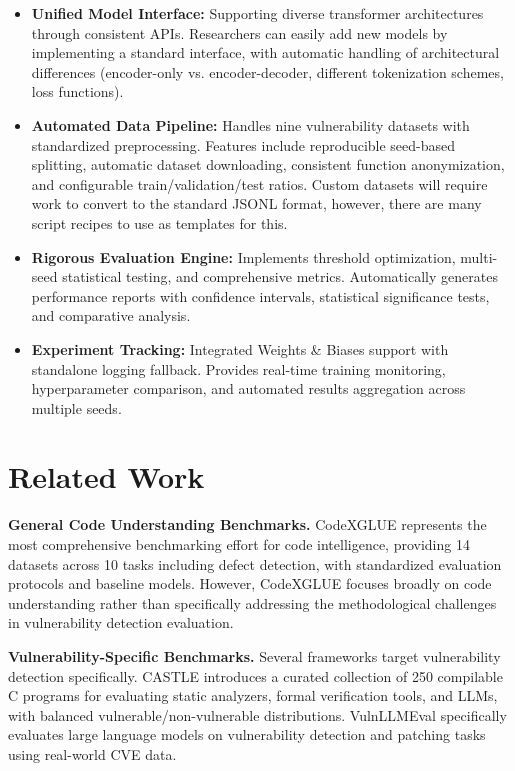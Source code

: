 \documentclass[letterpaper]{article}
\begin{document}
\begin{itemize}
	\item \textbf{Unified Model Interface:} Supporting diverse transformer architectures through consistent APIs. Researchers can easily add new models by implementing a standard interface, with automatic handling of architectural differences (encoder-only vs. encoder-decoder, different tokenization schemes, loss functions).
	\item \textbf{Automated Data Pipeline:} Handles nine vulnerability datasets with standardized preprocessing. Features include reproducible seed-based splitting, automatic dataset downloading, consistent function anonymization, and configurable train/validation/test ratios. Custom datasets will require work to convert to the standard JSONL format, however, there are many script recipes to use as templates for this.
	\item \textbf{Rigorous Evaluation Engine:} Implements threshold optimization, multi-seed statistical testing, and comprehensive metrics. Automatically generates performance reports with confidence intervals, statistical significance tests, and comparative analysis.
	\item \textbf{Experiment Tracking:} Integrated Weights \& Biases support with standalone logging fallback. Provides real-time training monitoring, hyperparameter comparison, and automated results aggregation across multiple seeds.

\end{itemize}
\section{Related Work}

\textbf{General Code Understanding Benchmarks.} CodeXGLUE \citep{lu2021codexglue} represents the most comprehensive benchmarking effort for code intelligence, providing 14 datasets across 10 tasks including defect detection, with standardized evaluation protocols and baseline models. However, CodeXGLUE focuses broadly on code understanding rather than specifically addressing the methodological challenges in vulnerability detection evaluation.

\textbf{Vulnerability-Specific Benchmarks.} Several frameworks target vulnerability detection specifically. CASTLE \citep{castle2025} introduces a curated collection of 250 compilable C programs for evaluating static analyzers, formal verification tools, and LLMs, with balanced vulnerable/non-vulnerable distributions. VulnLLMEval \citep{vulnllmeval2024} specifically evaluates large language models on vulnerability detection and patching tasks using real-world CVE data.
\end{document}
